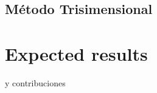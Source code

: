 \documentclass[submission]{eptcs}
\begin{document}
\subsection{Método Trisimensional}

\section{Expected results}

 y contribuciones

\nocite{*}


\end{document}
